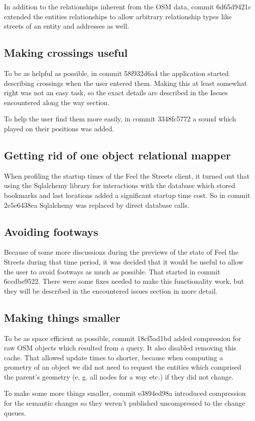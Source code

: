 \documentclass[nolof,digital]{fithesis3}
\begin{document}
In addition to the relationships inherent from the OSM data, commit 6d65d9421c extended the entities relationships to allow arbitrary relationship types like streets of an entity and addresses as well. 
\subsection{Making crossings useful}
To be as helpful as possible, in commit 58f932d6a4 the application started describing crossings when the user entered them. Making this at least somewhat right was not an easy task, so the exact details are described in the Issues encountered along the way section.

To help the user find them more easily, in commit 3348fc5772 a sound which played on their positions was added.
\subsection{Getting rid of one object relational mapper}
When profiling the startup times of the Feel the Streets client, it turned out that using the Sqlalchemy library for interactions with the database which stored bookmarks and last locations added a significant startup time cost. So in commit 2e5e6438ea Sqlalchemy was replaced by direct database calls.
\subsection{Avoiding footways}
Because of some more discussions during the previews of the state of Feel the Streets during that time period, it was decided that it would be useful to allow the user to avoid footways as much as possible. That started in commit 6ccdbe9522. There were some fixes needed to make this functionality work, but they will be described in the encountered issues section in more detail.
\subsection{Making things smaller}
To be as space efficient as possible, commit 18cf5ad1bd added compression for raw OSM objects which resulted from a query. It also disabled removing this cache. That allowed update times to shorter, because when computing a geometry of an object we did not need to request the entities which comprised the parent's geometry (e. g. all nodes for a way etc.) if they did not change.

To make some more things smaller, commit e3894ed98a introduced compression for the semantic changes so they weren't published uncompressed to the change queues.
\end{document}
